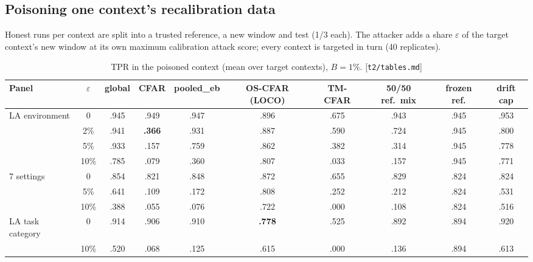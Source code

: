 \documentclass[11pt]{article}
\newcommand{\src}[1]{{\footnotesize\textcolor{ink2}{[\nolinkurl{#1}]}}}
\begin{document}
\subsection{Poisoning one context's recalibration data}
Honest runs per context are split into a trusted reference, a new window and test (1/3 each). The attacker adds a share $\varepsilon$ of the target context's new window at its own maximum calibration attack score; every context is targeted in turn (40 replicates).

\begin{table}[!htb]\centering\small
\begin{adjustbox}{max width=\linewidth}\begin{tabular}{@{}lccccccccc@{}}
\toprule
Panel & $\varepsilon$ & global & CFAR & pooled\_eb & OS-CFAR (LOCO) & TM-CFAR & 50/50 ref.\ mix & frozen ref. & drift cap\\
\midrule
LA environment & 0 & .945 & .949 & .947 & .896 & .675 & .943 & .945 & .953\\
& 2\% & .941 & \textbf{.366} & .931 & .887 & .590 & .724 & .945 & .800\\
& 5\% & .933 & .157 & .759 & .862 & .382 & .314 & .945 & .778\\
& 10\% & .785 & .079 & .360 & .807 & .033 & .157 & .945 & .771\\
7 settings & 0 & .854 & .821 & .848 & .872 & .655 & .829 & .824 & .824\\
& 5\% & .641 & .109 & .172 & .808 & .252 & .212 & .824 & .531\\
& 10\% & .388 & .055 & .076 & .722 & .000 & .108 & .824 & .516\\
LA task category & 0 & .914 & .906 & .910 & \textbf{.778} & .525 & .892 & .894 & .920\\
& 10\% & .520 & .068 & .125 & .615 & .000 & .136 & .894 & .613\\
\bottomrule
\end{tabular}\end{adjustbox}
\caption{TPR in the poisoned context (mean over target contexts), $B=1\%$. \src{t2/tables.md}}
\end{table}
\end{document}
